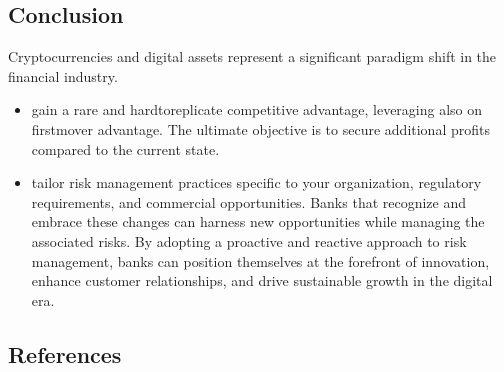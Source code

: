 \documentclass[letterpaper,10pt,english]{jupyterBook}
\begin{document}
\subsection{Conclusion}
\label{\detokenize{ARM/arm:conclusion}}
\sphinxAtStartPar
Cryptocurrencies and digital assets represent a significant paradigm shift in the financial industry.

\sphinxAtStartPar
{}
\begin{itemize}
\item {} 
\sphinxAtStartPar
gain a rare and hard\sphinxhyphen{}to\sphinxhyphen{}replicate competitive advantage, leveraging also on first\sphinxhyphen{}mover advantage. The ultimate objective is to secure additional profits compared to the current state.

\item {} 
\sphinxAtStartPar
tailor risk management practices specific to your organization, regulatory requirements, and commercial opportunities. Banks that recognize and embrace these changes can harness new opportunities while managing the associated risks. By adopting a proactive and reactive approach to risk management, banks can position themselves at the forefront of innovation, enhance customer relationships, and drive sustainable growth in the digital era.

\end{itemize}




\subsection{References}
\label{\detokenize{ARM/arm:references}}
\sphinxstepscope
\end{document}

